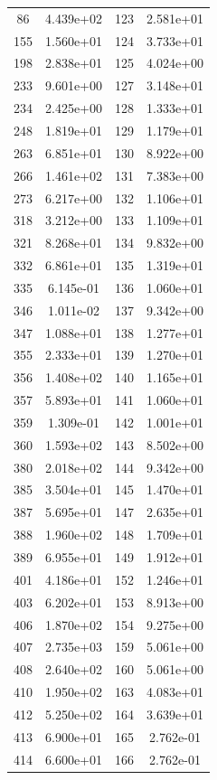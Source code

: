 \documentclass[12pt]{article}
\begin{document}
\begin{longtable}{@{}cccc@{}}
86 & 4.439e+02 & 123 & 2.581e+01 \\
155 & 1.560e+01 & 124 & 3.733e+01 \\
198 & 2.838e+01 & 125 & 4.024e+00 \\
233 & 9.601e+00 & 127 & 3.148e+01 \\
234 & 2.425e+00 & 128 & 1.333e+01 \\
248 & 1.819e+01 & 129 & 1.179e+01 \\
263 & 6.851e+01 & 130 & 8.922e+00 \\
266 & 1.461e+02 & 131 & 7.383e+00 \\
273 & 6.217e+00 & 132 & 1.106e+01 \\
318 & 3.212e+00 & 133 & 1.109e+01 \\
321 & 8.268e+01 & 134 & 9.832e+00 \\
332 & 6.861e+01 & 135 & 1.319e+01 \\
335 & 6.145e-01 & 136 & 1.060e+01 \\
346 & 1.011e-02 & 137 & 9.342e+00 \\
347 & 1.088e+01 & 138 & 1.277e+01 \\
355 & 2.333e+01 & 139 & 1.270e+01 \\
356 & 1.408e+02 & 140 & 1.165e+01 \\
357 & 5.893e+01 & 141 & 1.060e+01 \\
359 & 1.309e-01 & 142 & 1.001e+01 \\
360 & 1.593e+02 & 143 & 8.502e+00 \\
380 & 2.018e+02 & 144 & 9.342e+00 \\
385 & 3.504e+01 & 145 & 1.470e+01 \\
387 & 5.695e+01 & 147 & 2.635e+01 \\
388 & 1.960e+02 & 148 & 1.709e+01 \\
389 & 6.955e+01 & 149 & 1.912e+01 \\
401 & 4.186e+01 & 152 & 1.246e+01 \\
403 & 6.202e+01 & 153 & 8.913e+00 \\
406 & 1.870e+02 & 154 & 9.275e+00 \\
407 & 2.735e+03 & 159 & 5.061e+00 \\
408 & 2.640e+02 & 160 & 5.061e+00 \\
410 & 1.950e+02 & 163 & 4.083e+01 \\
412 & 5.250e+02 & 164 & 3.639e+01 \\
413 & 6.900e+01 & 165 & 2.762e-01 \\
414 & 6.600e+01 & 166 & 2.762e-01 \\

\end{longtable}
\end{document}

